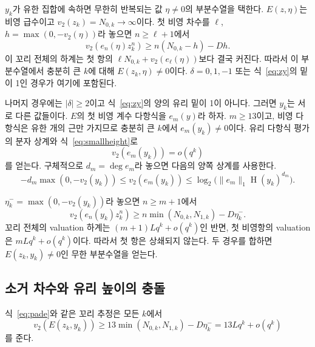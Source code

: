 \documentclass[11pt,a4paper]{article}
\theoremstyle{koreanplain}
\newcommand{\vTwo}{v_2}
\newcommand{\htQ}{\operatorname{H}}
\begin{document}
$y_k$가 유한 집합에 속하면 무한히 반복되는 값 $\eta\ne0$의 부분수열을 택한다. $E(z,\eta)$는 비영 급수이고 $\vTwo(z_k)=N_{0,k}\to\infty$이다. 첫 비영 차수를 $\ell$, $h=\max(0,-\vTwo(\eta))$라 놓으면 $n\ge\ell+1$에서
\[
\vTwo(e_n(\eta)z_k^n)\ge n(N_{0,k}-h)-Dh.
\]
이 꼬리 전체의 하계는 첫 항의 $\ell N_{0,k}+\vTwo(e_\ell(\eta))$보다 결국 커진다. 따라서 이 부분수열에서 충분히 큰 $k$에 대해 $E(z_k,\eta)\ne0$이다. $\delta=0,1,-1$ 또는 식~\eqref{eq:zy}의 밑이 1인 경우가 여기에 포함된다.

나머지 경우에는 $|\delta|\ge2$이고 식~\eqref{eq:zy}의 양의 유리 밑이 1이 아니다. 그러면 $y_k$는 서로 다른 값들이다. $E$의 첫 비영 계수 다항식을 $e_m(y)$라 하자. $m\ge13$이고, 비영 다항식은 유한 개의 근만 가지므로 충분히 큰 $k$에서 $e_m(y_k)\ne0$이다. 유리 다항식 평가의 분자 상계와 식~\eqref{eq:smallheight}로
\begin{equation}\label{eq:leadingheight}
\vTwo(e_m(y_k))=o(q^k)
\end{equation}
를 얻는다. 구체적으로 $d_m=\deg e_m$라 놓으면 다음의 양쪽 상계를 사용한다.
\[
-d_m\max(0,-\vTwo(y_k))
\le \vTwo(e_m(y_k))
\le \log_2\bigl(\|e_m\|_1\htQ(y_k)^{d_m}\bigr).
\]

$\eta_k^-=\max(0,-\vTwo(y_k))$라 놓으면 $n\ge m+1$에서
\begin{equation}\label{eq:tail}
\vTwo(e_n(y_k)z_k^n)
\ge n\min(N_{0,k},N_{1,k})-D\eta_k^-.
\end{equation}
꼬리 전체의 valuation 하계는 $(m+1)Lq^k+o(q^k)$인 반면, 첫 비영항의 valuation은 $mLq^k+o(q^k)$이다. 따라서 첫 항은 상쇄되지 않는다. 두 경우를 합하면 $E(z_k,y_k)\ne0$인 무한 부분수열을 얻는다.

\subsection{소거 차수와 유리 높이의 충돌}

식~\eqref{eq:pade}와 같은 꼬리 추정은 모든 $k$에서
\begin{equation}\label{eq:lower}
\vTwo(E(z_k,y_k))
\ge13\min(N_{0,k},N_{1,k})-D\eta_k^-
=13Lq^k+o(q^k)
\end{equation}
를 준다.
\end{document}
